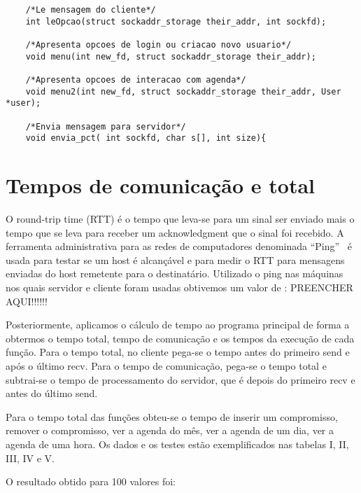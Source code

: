 \documentclass[10pt,a4paper]{article}
\begin{document}
\begin{itemize}
\begin{lstlisting}
    /*Le mensagem do cliente*/
    int leOpcao(struct sockaddr_storage their_addr, int sockfd);
   
    /*Apresenta opcoes de login ou criacao novo usuario*/
    void menu(int new_fd, struct sockaddr_storage their_addr);
  
    /*Apresenta opcoes de interacao com agenda*/
    void menu2(int new_fd, struct sockaddr_storage their_addr, User *user);

    /*Envia mensagem para servidor*/
    void envia_pct( int sockfd, char s[], int size){

  \end{lstlisting}


\end{itemize}


\section{Tempos de comunicação e total}
O round-trip time (RTT) é o tempo que leva-se para um sinal ser
enviado mais o tempo que se leva para receber um acknowledgment que o
sinal foi recebido. A ferramenta administrativa para as redes de
computadores denominada ``Ping''~\cite{Ping} é usada para testar se um host é alcançável e para
medir o RTT para mensagens enviadas do host remetente para o
destinatário.
Utilizado o ping nas máquinas nos quais servidor e cliente foram
usadas obtivemos um valor de : PREENCHER AQUI!!!!!!

Posteriormente, aplicamos o cálculo de tempo ao programa principal de
forma a obtermos o tempo total,  tempo de comunicação e os tempos da
execução de cada função.
Para o tempo total, no cliente pega-se o tempo antes do primeiro send e após o último recv.
Para o tempo de comunicação, pega-se o tempo total e subtrai-se o tempo de processamento do servidor,
que é depois do primeiro recv e antes do último send.

Para o tempo total das funções obteu-se o tempo de inserir um
compromisso, remover o compromisso, ver a agenda do mês, ver a agenda
de um dia, ver a agenda de uma hora. Os dados e os testes estão
exemplificados nas tabelas I, II, III, IV e V.

O resultado obtido para 100 valores foi:
\end{document}

